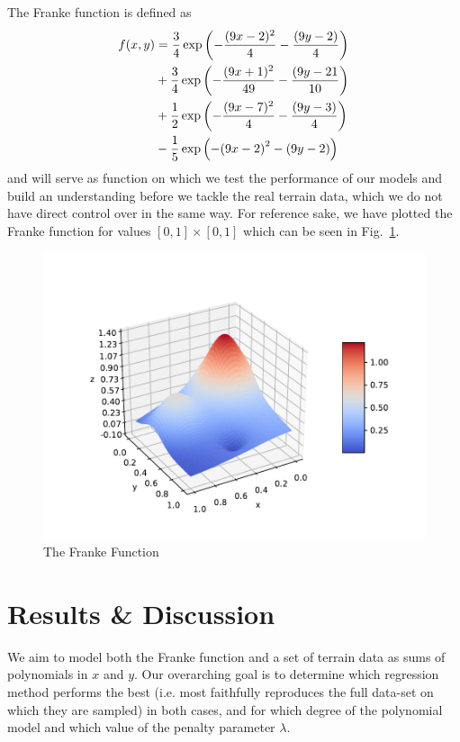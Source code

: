 \documentclass[reprint, english, nofootinbib]{revtex4-2}
\begin{document}
        The Franke function is defined as
        \begin{align}
        \label{eq:franke}
            \begin{split}
                f(x, y)
                &= \frac{3}{4}\exp\qty(-\frac{(9x - 2)^2}{4} - \frac{(9y - 2)}{4})      \\
                &+ \frac{3}{4}\exp\qty(-\frac{(9x + 1)^2}{49} - \frac{(9y - 21}{10})    \\
                &+ \frac{1}{2}\exp\qty(-\frac{(9x - 7)^2}{4} - \frac{(9y - 3)}{4})      \\
                &- \frac{1}{5}\exp\qty(-\qty(9x - 2)^2 - \qty(9y - 2))
            \end{split}
        \end{align}
        and will serve as function on which we test the performance of our models and build an understanding before we tackle the real terrain data, which we do not have direct control over in the same way. For reference sake, we have plotted the Franke function for values $[0, 1]\times[0,1]$ which can be seen in Fig.~\ref{fig:FrankeFunction}.
        \begin{figure}[h!tb]
            \center
            \includegraphics[width=\columnwidth]{frankefunc.pdf}
            \caption{\label{fig:FrankeFunction}The Franke Function}
        \end{figure}

\section{Results \& Discussion}
\noindent
We aim to model both the Franke function and a set of terrain data as sums of polynomials in $x$ and $y$. Our overarching goal is to determine which regression method performs the best (i.e. most faithfully reproduces the full data-set on which they are sampled) in both cases, and for which degree of the polynomial model and which value of the penalty parameter $\lambda$.
\end{document}
